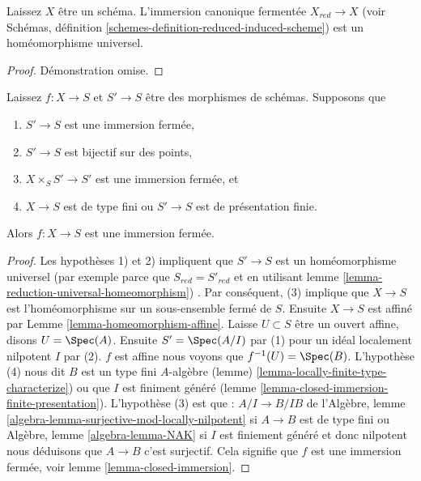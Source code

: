 \begin{lemma}

\label{lemma-reduction-universal-homeomorphism}
Laissez $X$ être un schéma. L'immersion canonique fermentée $X_{red} \to X$ (voir Schémas, définition \ref{schemes-definition-reduced-induced-scheme}) est un homéomorphisme universel.
\end{lemma}

\begin{proof}
Démonstration omise.
\end{proof}

\begin{lemma}

\label{lemma-check-closed-infinitesimally}
Laissez $f : X \to S$ et $S' \to S$ être des morphismes de schémas. Supposons que
\begin{enumerate}
\item $S' \to S$ est une immersion fermée,
\item $S' \to S$ est bijectif sur des points,
\item $X \times_S S' \to S'$ est une immersion fermée, et
\item $X \to S$ est de type fini ou $S' \to S$ est de présentation finie.
\end{enumerate}
Alors $f : X \to S$ est une immersion fermée.
\end{lemma}

\begin{proof}

Les hypothèses 1) et 2) impliquent que $S' \to S$ est un homéomorphisme universel (par exemple parce que $S_{red} = S'_{red}$ et en utilisant lemme \ref{lemma-reduction-universal-homeomorphism}) . Par conséquent, (3) implique que $X \to S$ est l'homéomorphisme sur un sous-ensemble fermé de $S$. Ensuite $X \to S$ est affiné par Lemme \ref{lemma-homeomorphism-affine}. Laisse $U \subset S$ être un ouvert affine, disons $U = \Spec(A)$. Ensuite $S' = \Spec(A/I)$
par (1) pour un idéal localement nilpotent $I$ par (2). $f$ est affine nous voyons que
$f^{-1}(U) = \Spec(B)$. L'hypothèse (4) nous dit $B$ est un type fini $A$-algèbre (lemme) \ref{lemma-locally-finite-type-characterize}) ou que $I$ est finiment généré (lemme \ref{lemma-closed-immersion-finite-presentation}). L'hypothèse (3) est que : $A/I \to B/IB$ de l'Algèbre, lemme \ref{algebra-lemma-surjective-mod-locally-nilpotent}
si $A \to B$ est de type fini ou Algèbre, lemme \ref{algebra-lemma-NAK} si $I$ est finiement généré et donc nilpotent nous déduisons que $A \to B$ c'est surjectif. Cela signifie que $f$ est une immersion fermée, voir lemme \ref{lemma-closed-immersion}.

\end{proof}

